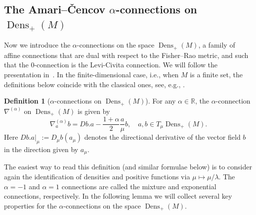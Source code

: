 \documentclass[11pt,reqno]{amsart}
\theoremstyle{definition}
\newtheorem{definition}[theorem]{Definition}
\newcommand{\dx}{\lambda}
\newcommand{\Prob}{\operatorname{Prob}(M)}
\newcommand{\Dens}{\operatorname{Dens}_+(M)}
\begin{document}
\subsection{The Amari--\v{C}encov $\alpha$-connections on $\Dens$}
Now we introduce the $\alpha$-connections on the space $\Dens$, a family of affine connections that are dual with respect to the Fisher--Rao metric, and such that the $0$-connection is the Levi-Civita connection. We will follow the presentation in~\cite{bauer2024p}. In the finite-dimensional case, i.e., when $M$ is a finite set, the definitions below coincide with the classical ones, see, e.g., \cite{amari2000methods,ay2015information}.
\begin{definition}[$\alpha$-connections on $\Dens$]\label{lem:alphacon}
    For any $\alpha\in \mathbb R$, the $\alpha$-connection $\nabla^{(\alpha)}$ on $\Dens$ is given by
    \begin{equation}\label{alpha-dens}
    \nabla^{(\alpha)}_a b = Db.a - \frac{1+\alpha}{2} \frac{a}{\mu}b,\quad a,b\in T_\mu\Dens.
    \end{equation}
    Here $Db.a|_{\mu}:=D_\mu b(a_\mu)$ denotes the directional derivative of the vector field $b$ in the direction given by $a_\mu$. 
\end{definition}
The easiest way to read this definition (and similar formulae below) is to consider again the identification of densities and positive functions via $\mu\mapsto \mu/\dx$. 
The $\alpha=-1$ and $\alpha=1$ connections are called the mixture and exponential connections, respectively. In the following lemma we will collect several key properties for the $\alpha$-connections on the space  $\Dens$.
\end{document}

